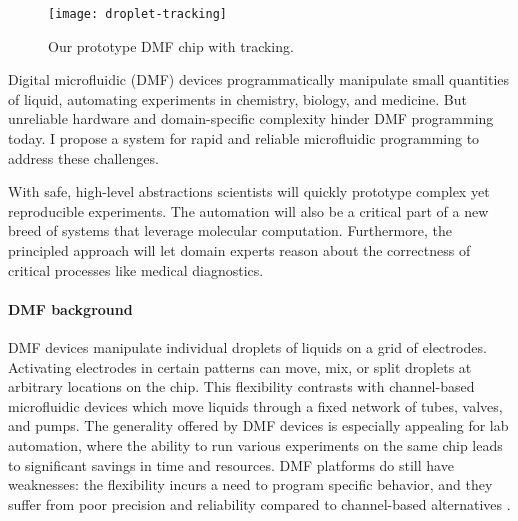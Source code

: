 \documentclass[12pt]{article}
\begin{document}
\begin{wrapfigure}{r}{0.19\linewidth}
  \footnotesize
  \centering
  \texttt{[image: droplet-tracking]}
  \caption*{Our prototype DMF chip with tracking.}
  \vspace{-1em}
\end{wrapfigure}


Digital microfluidic (DMF) devices programmatically manipulate small quantities of liquid,
automating experiments in chemistry, biology, and medicine.
But unreliable hardware and domain-specific complexity hinder DMF programming today.
I propose a system for rapid and reliable microfluidic programming to address these challenges.

With safe, high-level abstractions scientists will quickly prototype complex yet reproducible experiments.
The automation will also be a critical part of a new breed of systems that leverage molecular computation.
Furthermore, the principled approach will let domain experts reason about the correctness of critical processes like medical diagnostics.


\paragraph{DMF background}
DMF devices manipulate individual droplets of liquids on a grid of electrodes.
Activating electrodes in certain patterns can move, mix, or split droplets at arbitrary locations on the chip.
This flexibility contrasts with channel-based microfluidic devices which move liquids through a fixed network of tubes, valves, and pumps.
The generality offered by DMF devices is especially appealing for lab automation, where the ability to run various experiments on the same chip leads to significant savings in time and resources.
DMF platforms do still have weaknesses: the flexibility incurs a need to program specific behavior, and they suffer from poor precision and reliability compared to channel-based alternatives \cite{dmf-review}.
\end{document}
